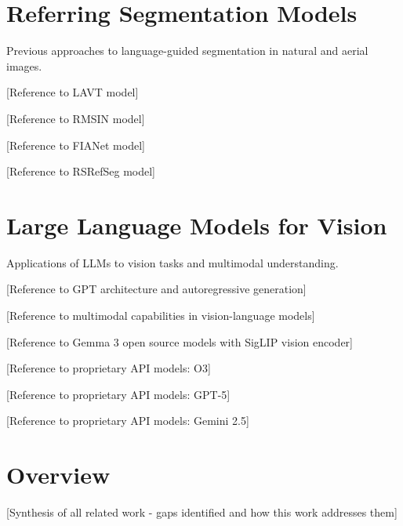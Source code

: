 \section{Referring Segmentation Models}

Previous approaches to language-guided segmentation in natural and aerial images.

[Reference to LAVT model] %

[Reference to RMSIN model] %

[Reference to FIANet model] %

[Reference to RSRefSeg model] %

\section{Large Language Models for Vision}

Applications of LLMs to vision tasks and multimodal understanding.

[Reference to GPT architecture and autoregressive generation] %

[Reference to multimodal capabilities in vision-language models] %

[Reference to Gemma 3 open source models with SigLIP vision encoder] %

[Reference to proprietary API models: O3] %

[Reference to proprietary API models: GPT-5] %

[Reference to proprietary API models: Gemini 2.5] %

\section{Overview}

[Synthesis of all related work - gaps identified and how this work addresses them] %